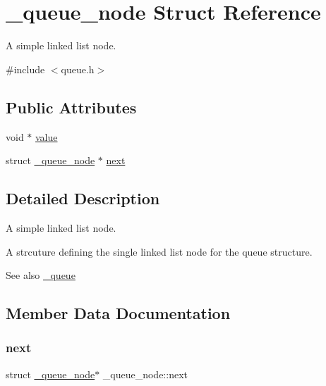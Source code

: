 \hypertarget{struct__queue__node}{}\section{\+\_\+queue\+\_\+node Struct Reference}
\label{struct__queue__node}


A simple linked list node.  




{\ttfamily \#include $<$queue.\+h$>$}

\subsection*{Public Attributes}
\begin{DoxyCompactItemize}
\item 
void $\ast$ \hyperlink{struct__queue__node_a318b8c0ae9d8062ddebbc8f6a46fdd97}{value}
\item 
struct \hyperlink{struct__queue__node}{\+\_\+queue\+\_\+node} $\ast$ \hyperlink{struct__queue__node_a95be05d8f02322217bcd7c643e22bb14}{next}
\end{DoxyCompactItemize}


\subsection{Detailed Description}
A simple linked list node. 

A strcuture defining the single linked list node for the queue structure.

\begin{DoxySeeAlso}{See also}
\hyperlink{struct__queue}{\+\_\+queue} 
\end{DoxySeeAlso}


\subsection{Member Data Documentation}
\mbox{\label{struct__queue__node_a95be05d8f02322217bcd7c643e22bb14}} 
\subsubsection{\texorpdfstring{next}{next}}
{\footnotesize\ttfamily struct \hyperlink{struct__queue__node}{\+\_\+queue\+\_\+node}$\ast$ \+\_\+queue\+\_\+node\+::next}

